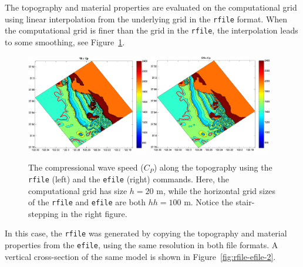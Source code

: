 \documentclass[11pt]{report}
\begin{document}
The topography and material properties are evaluated on the computational grid using linear
interpolation from the underlying grid in the {\tt rfile} format. When the computational grid is
finer than the grid in the {\tt rfile}, the interpolation leads to some smoothing, see
Figure~\ref{fig:rfile-efile}.
\begin{figure}
\begin{centering}
  \includegraphics[width=0.48\textwidth]{figures/rfile-cp.png}\hfill
\includegraphics[width=0.48\textwidth]{figures/efile-cp.png}\\
  \caption{The compressional wave speed ($C_P$) along the topography using the {\tt rfile} (left) and the {\tt efile} (right) commands. Here,
    the computational grid has size $h=20$ m, while the horizontal grid sizes of the {\tt rfile}
  and {\tt efile} are both $hh=100$ m. Notice the stair-stepping in the right figure.}
  \label{fig:rfile-efile}
\end{centering}
\end{figure}
In this case, the {\tt rfile} was generated by copying the topography and material properties from
the {\tt efile}, using the same resolution in both file formats. A vertical cross-section of the same
model is shown in Figure~\ref{fig:rfile-efile-2}.
\end{document}
